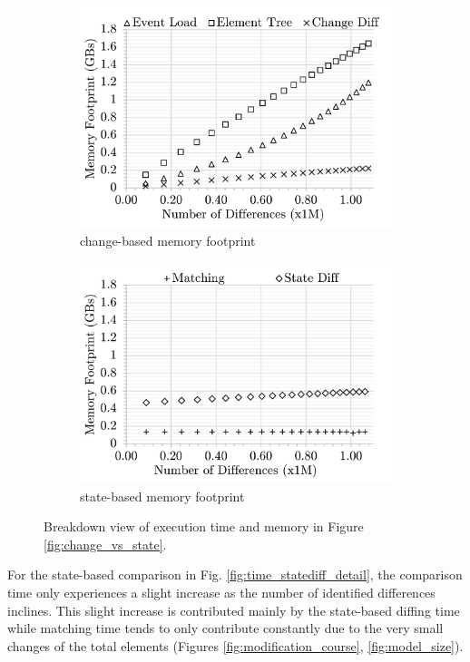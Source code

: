 \documentclass{jot}
\begin{document}
\begin{figure}[ht]
\begin{subfigure}[t]{0.495\linewidth}
        \includegraphics[width=\linewidth]{Memory-ChangeDiff-Detail}
        \caption{change-based memory footprint}
        \label{fig:memory_changediff_detail}
    \end{subfigure}
    \hfill
    \begin{subfigure}[t]{0.495\linewidth}
        \includegraphics[width=\linewidth]{Memory-StateDiff-Detail}
        \caption{state-based memory footprint}
        \label{fig:memory_statediff_detail}
    \end{subfigure}
    \caption{Breakdown view of execution time and memory in Figure \ref{fig:change_vs_state}.}
    \label{fig:time_memory_detail}
\end{figure}

For the state-based comparison in Fig. \ref{fig:time_statediff_detail}, the comparison time only experiences a slight increase as the number of identified differences inclines. This slight increase is contributed mainly by the state-based diffing time while matching time tends to only contribute constantly due to the very small changes of the total elements (Figures \ref{fig:modification_course}, \ref{fig:model_size}).
\end{document}
